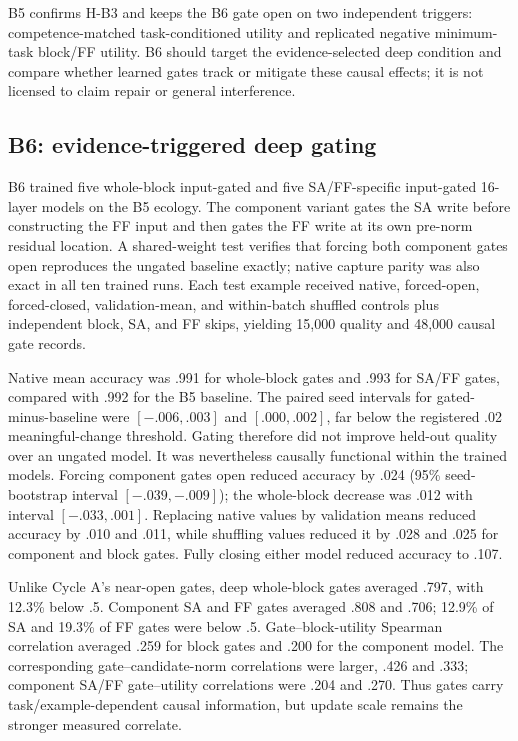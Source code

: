 \documentclass[10pt]{article}
\begin{document}
B5 confirms H-B3 and keeps the B6 gate open on two independent triggers: competence-matched task-conditioned utility and replicated negative minimum-task block/FF utility. B6 should target the evidence-selected deep condition and compare whether learned gates track or mitigate these causal effects; it is not licensed to claim repair or general interference.

\subsection{B6: evidence-triggered deep gating}
B6 trained five whole-block input-gated and five SA/FF-specific input-gated 16-layer models on the B5 ecology. The component variant gates the SA write before constructing the FF input and then gates the FF write at its own pre-norm residual location. A shared-weight test verifies that forcing both component gates open reproduces the ungated baseline exactly; native capture parity was also exact in all ten trained runs. Each test example received native, forced-open, forced-closed, validation-mean, and within-batch shuffled controls plus independent block, SA, and FF skips, yielding 15,000 quality and 48,000 causal gate records.

Native mean accuracy was .991 for whole-block gates and .993 for SA/FF gates, compared with .992 for the B5 baseline. The paired seed intervals for gated-minus-baseline were $[-.006,.003]$ and $[.000,.002]$, far below the registered .02 meaningful-change threshold. Gating therefore did not improve held-out quality over an ungated model. It was nevertheless causally functional within the trained models. Forcing component gates open reduced accuracy by .024 (95\% seed-bootstrap interval $[-.039,-.009]$); the whole-block decrease was .012 with interval $[-.033,.001]$. Replacing native values by validation means reduced accuracy by .010 and .011, while shuffling values reduced it by .028 and .025 for component and block gates. Fully closing either model reduced accuracy to .107.

Unlike Cycle A's near-open gates, deep whole-block gates averaged .797, with 12.3\% below .5. Component SA and FF gates averaged .808 and .706; 12.9\% of SA and 19.3\% of FF gates were below .5. Gate--block-utility Spearman correlation averaged .259 for block gates and .200 for the component model. The corresponding gate--candidate-norm correlations were larger, .426 and .333; component SA/FF gate--utility correlations were .204 and .270. Thus gates carry task/example-dependent causal information, but update scale remains the stronger measured correlate.
\end{document}
